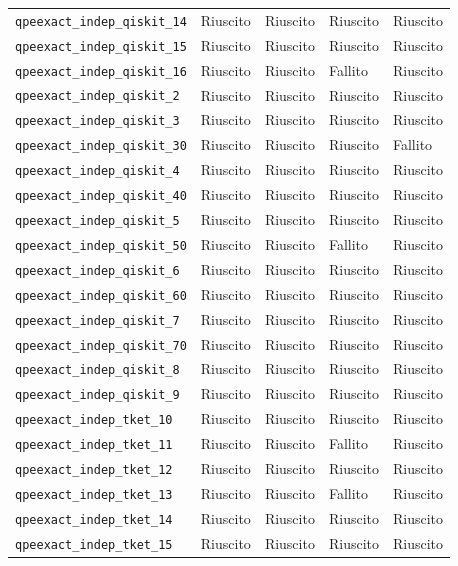 \begin{longtable}{>{\raggedright\arraybackslash}p{6.8cm}>{\centering\arraybackslash}p{2.0cm}>{\centering\arraybackslash}p{2.0cm}>{\centering\arraybackslash}p{2.0cm}>{\centering\arraybackslash}p{2.0cm}}
\nolinkurl{qpeexact_indep_qiskit_14} & Riuscito & Riuscito & Riuscito & Riuscito \\
\nolinkurl{qpeexact_indep_qiskit_15} & Riuscito & Riuscito & Riuscito & Riuscito \\
\nolinkurl{qpeexact_indep_qiskit_16} & Riuscito & Riuscito & Fallito & Riuscito \\
\nolinkurl{qpeexact_indep_qiskit_2} & Riuscito & Riuscito & Riuscito & Riuscito \\
\nolinkurl{qpeexact_indep_qiskit_3} & Riuscito & Riuscito & Riuscito & Riuscito \\
\nolinkurl{qpeexact_indep_qiskit_30} & Riuscito & Riuscito & Riuscito & Fallito \\
\nolinkurl{qpeexact_indep_qiskit_4} & Riuscito & Riuscito & Riuscito & Riuscito \\
\nolinkurl{qpeexact_indep_qiskit_40} & Riuscito & Riuscito & Riuscito & Riuscito \\
\nolinkurl{qpeexact_indep_qiskit_5} & Riuscito & Riuscito & Riuscito & Riuscito \\
\nolinkurl{qpeexact_indep_qiskit_50} & Riuscito & Riuscito & Fallito & Riuscito \\
\nolinkurl{qpeexact_indep_qiskit_6} & Riuscito & Riuscito & Riuscito & Riuscito \\
\nolinkurl{qpeexact_indep_qiskit_60} & Riuscito & Riuscito & Riuscito & Riuscito \\
\nolinkurl{qpeexact_indep_qiskit_7} & Riuscito & Riuscito & Riuscito & Riuscito \\
\nolinkurl{qpeexact_indep_qiskit_70} & Riuscito & Riuscito & Riuscito & Riuscito \\
\nolinkurl{qpeexact_indep_qiskit_8} & Riuscito & Riuscito & Riuscito & Riuscito \\
\nolinkurl{qpeexact_indep_qiskit_9} & Riuscito & Riuscito & Riuscito & Riuscito \\
\nolinkurl{qpeexact_indep_tket_10} & Riuscito & Riuscito & Riuscito & Riuscito \\
\nolinkurl{qpeexact_indep_tket_11} & Riuscito & Riuscito & Fallito & Riuscito \\
\nolinkurl{qpeexact_indep_tket_12} & Riuscito & Riuscito & Riuscito & Riuscito \\
\nolinkurl{qpeexact_indep_tket_13} & Riuscito & Riuscito & Fallito & Riuscito \\
\nolinkurl{qpeexact_indep_tket_14} & Riuscito & Riuscito & Riuscito & Riuscito \\
\nolinkurl{qpeexact_indep_tket_15} & Riuscito & Riuscito & Riuscito & Riuscito \\

\end{longtable}
